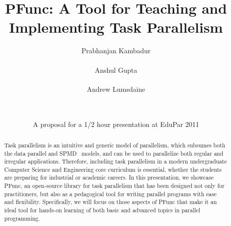 \documentclass[9pt,twocolumn,letter]{article}
\begin{document}
\title{PFunc: A Tool for Teaching and Implementing Task Parallelism}

\date{A proposal for a 1/2 hour presentation at EduPar 2011}

\author{
  \alignauthor Prabhanjan Kambadur\\
  \\
  \alignauthor Anshul Gupta\\
  \\
  \alignauthor Andrew Lumsdaine\\
  \\
  \\
}

\maketitle

\begin{abstract} 
Task parallelism is an intuitive and generic model of parallelism, which
subsumes both the data parallel and SPMD~\cite{darema2001} models, and can be
used to parallelize both regular and irregular applications.
%
Therefore, including task parallelism in a modern undergraduate Computer
Science and Engineering core curriculum is essential, whether the students are
preparing for industrial or academic careers.
%
In this presentation, we showcase PFunc, an open-source library for
task parallelism that has been designed not only for practitioners, 
but also as
a pedagogical tool for writing parallel programs with ease and flexibility.
%
Specifically, we will focus on those aspects of PFunc that make it an ideal 
tool for hands-on
learning of both basic and advanced topics in parallel programming.
\end{abstract}
\end{document}
